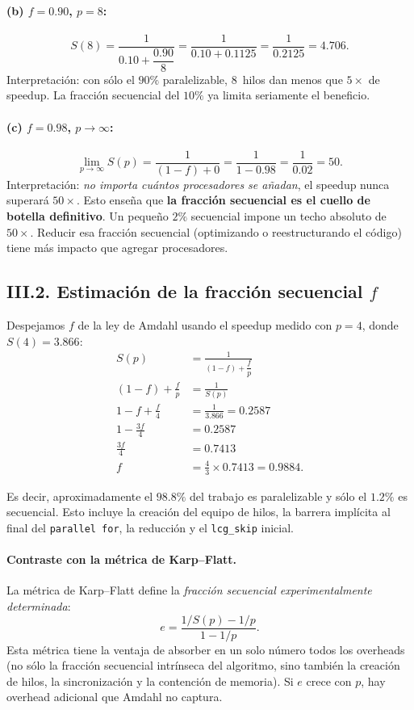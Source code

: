 \documentclass[12pt,a4paper]{article}
\begin{document}
\paragraph{(b) $f=0.90$, $p=8$:}
\[
S(8) = \frac{1}{0.10 + \dfrac{0.90}{8}}
     = \frac{1}{0.10 + 0.1125}
     = \frac{1}{0.2125}
     = 4.706.
\]
Interpretaci\'on: con s\'olo el $90\%$ paralelizable, 8~hilos dan menos que $5\times$ de speedup. La fracci\'on secuencial del $10\%$ ya limita seriamente el beneficio.

\paragraph{(c) $f=0.98$, $p\to\infty$:}
\[
\lim_{p\to\infty} S(p)
= \frac{1}{(1-f) + 0}
= \frac{1}{1-0.98}
= \frac{1}{0.02}
= 50.
\]
Interpretaci\'on: \emph{no importa cu\'antos procesadores se a\~nadan}, el speedup nunca superar\'a $50\times$. Esto ense\~na que \textbf{la fracci\'on secuencial es el cuello de botella definitivo}. Un peque\~no $2\%$ secuencial impone un techo absoluto de $50\times$. Reducir esa fracci\'on secuencial (optimizando o reestructurando el c\'odigo) tiene m\'as impacto que agregar procesadores.

\subsection*{III.2. Estimaci\'on de la fracci\'on secuencial $f$}

Despejamos $f$ de la ley de Amdahl usando el speedup medido con $p=4$, donde $S(4)=3.866$:
\begin{align*}
S(p) &= \frac{1}{(1-f) + \dfrac{f}{p}} \\[6pt]
(1-f) + \frac{f}{p} &= \frac{1}{S(p)} \\[6pt]
1 - f + \frac{f}{4} &= \frac{1}{3.866} = 0.2587 \\[6pt]
1 - \frac{3f}{4} &= 0.2587 \\[6pt]
\frac{3f}{4} &= 0.7413 \\[6pt]
f &= \frac{4}{3}\times 0.7413 = \boxed{0.9884}.
\end{align*}

Es decir, aproximadamente el $98.8\%$ del trabajo es paralelizable y s\'olo el $1.2\%$ es secuencial. Esto incluye la creaci\'on del equipo de hilos, la barrera impl\'icita al final del \texttt{parallel for}, la reducci\'on y el \texttt{lcg\_skip} inicial.

\paragraph{Contraste con la m\'etrica de Karp--Flatt.}
La m\'etrica de Karp--Flatt define la \emph{fracci\'on secuencial experimentalmente determinada}:
\[
e = \frac{1/S(p) - 1/p}{1 - 1/p}.
\]
Esta m\'etrica tiene la ventaja de absorber en un solo n\'umero todos los overheads (no s\'olo la fracci\'on secuencial intr\'inseca del algoritmo, sino tambi\'en la creaci\'on de hilos, la sincronizaci\'on y la contenci\'on de memoria). Si $e$ crece con $p$, hay overhead adicional que Amdahl no captura.
\end{document}
